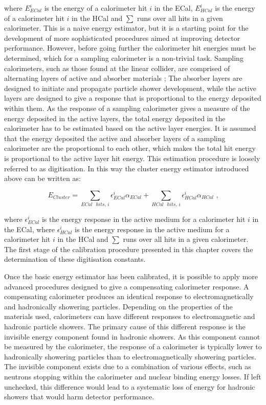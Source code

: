 \noindent where $E^{i}_{ECal}$ is the energy of a calorimeter hit $i$ in the ECal, $E^{i}_{HCal}$ is the energy of a calorimeter hit $i$ in the HCal and $\sum$ runs over all hits in a given calorimeter.  This is a naive energy estimator, but it is a starting point for the development of more sophisticated procedures aimed at improving detector performance.  However, before going further the calorimeter hit energies must be determined, which for a sampling calorimeter is a non-trivial task.  Sampling calorimeters, such as those found at the linear collider, are comprised of alternating layers of active and absorber materials \cite{Fabjan:2003aq};  The absorber layers are designed to initiate and propagate particle shower development, while the active layers are designed to give a response that is proportional to the energy deposited within them.  As the response of a sampling calorimeter gives a measure of the energy deposited in the active layers, the total energy deposited in the calorimeter has to be estimated based on the active layer energies.  It is assumed that the energy deposited the active and absorber layers of a sampling calorimeter are the proportional to each other, which makes the total hit energy is proportional to the active layer hit energy.  This estimation procedure is loosely referred to as digitisation.  In this way the cluster energy estimator introduced above can be written as:

\begin{equation}
E_{Cluster} = \sum_{ECal \text{ } hits \text{, }i} \epsilon^{i}_{ECal} \alpha_{ECal} + \sum_{HCal \text{ } hits \text{, }i} \epsilon^{i}_{HCal} \alpha_{HCal} \text{ ,}
\end{equation}

\noindent where $\epsilon^{i}_{ECal}$ is the energy response in the active medium for a calorimeter hit $i$ in the ECal, where $\epsilon^{i}_{HCal}$ is the energy response in the active medium for a calorimeter hit $i$ in the HCal and $\sum$ runs over all hits in a given calorimeter.  The first stage of the calibration procedure presented in this chapter covers the determination of these digitisation constants.  

Once the basic energy estimator has been calibrated, it is possible to apply more advanced procedures designed to give a compensating calorimeter response.  A compensating calorimeter produces an identical response to electromagnetically and hadronically showering particles.  Depending on the properties of the materials used, calorimeters can have different responses to electromagnetic and hadronic particle showers.  The primary cause of this different response is the invisible energy component found in hadronic showers.  As this component cannot be measured by the calorimeter, the response of a calorimeter is typically lower to hadronically showering particles than to electromagnetically showering particles.  The invisible component exists due to a combination of various effects, such as neutrons stopping within the calorimeter and nuclear binding energy losses.  If left unchecked, this difference would lead to a systematic loss of energy for hadronic showers that would harm detector performance.  

